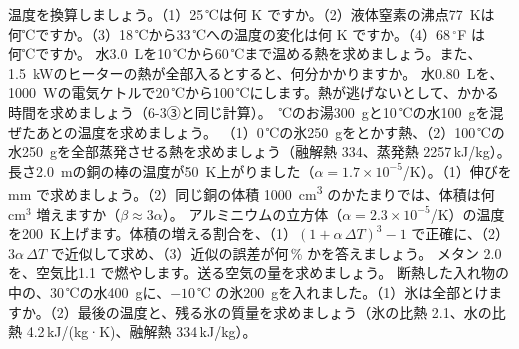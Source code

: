 \bkendproblems
\bkproblem 温度を換算しましょう。（1）25\,℃は何 K ですか。（2）液体窒素の沸点\qty{77}{K}は何℃ですか。（3）18\,℃から33\,℃への温度の変化は何 K ですか。（4）68\,$^{\circ}$F は何℃ですか。
\bkproblem 水\qty{3.0}{L}を10\,℃から60\,℃まで温める熱を求めましょう。また、\qty{1.5}{kW}のヒーターの熱が全部入るとすると、何分かかりますか。
\bkproblem 水\qty{0.80}{L}を、\qty{1000}{W}の電気ケトルで20\,℃から100\,℃にします。熱が逃げないとして、かかる時間を求めましょう（6-3③と同じ計算）。
\,℃のお湯\qty{300}{g}と10\,℃の水\qty{100}{g}を混ぜたあとの温度を求めましょう。
\bkproblem （1）0\,℃の氷\qty{250}{g}をとかす熱、（2）100\,℃の水\qty{250}{g}を全部蒸発させる熱を求めましょう（融解熱 334、蒸発熱 2257\,kJ/kg）。
\bkproblem 長さ\qty{2.0}{m}の銅の棒の温度が\qty{50}{K}上がりました（$\alpha=1.7\times10^{-5}$/K）。（1）伸びを mm で求めましょう。（2）同じ銅の体積 \qty{1000}{cm^3} のかたまりでは、体積は何 cm$^3$ 増えますか（$\beta\approx3\alpha$）。
\bkproblem アルミニウムの立方体（$\alpha=2.3\times10^{-5}$/K）の温度を\qty{200}{K}上げます。体積の増える割合を、（1）$(1+\alpha\,\Delta T)^3-1$ で正確に、（2）$3\alpha\,\Delta T$ で近似して求め、（3）近似の誤差が何\,\% かを答えましょう。
\bkproblem メタン 2.0\qxbmN を、空気比1.1 で燃やします。送る空気の量を求めましょう。
\bkproblem 断熱した入れ物の中の、30\,℃の水\qty{400}{g}に、$-10$\,℃ の氷\qty{200}{g}を入れました。（1）氷は全部とけますか。（2）最後の温度と、残る氷の質量を求めましょう（氷の比熱 2.1、水の比熱 4.2\,kJ/(kg·K)、融解熱 334\,kJ/kg）。
